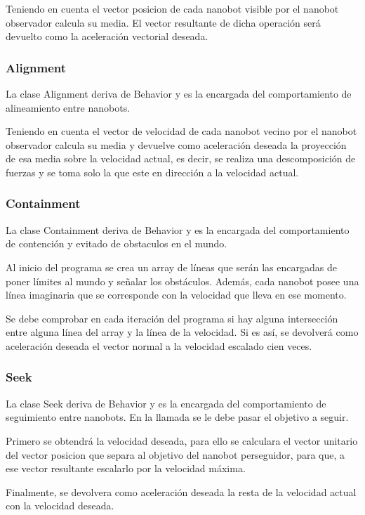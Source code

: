 Teniendo en cuenta el vector posicion de cada nanobot visible por el nanobot observador calcula su media. El vector resultante de dicha operación será devuelto como la aceleración vectorial deseada.

\subsubsection{Alignment}
\label{sec:alignment}
La clase Alignment deriva de Behavior y es la encargada del comportamiento de alineamiento entre nanobots.

Teniendo en cuenta el vector de velocidad de cada nanobot vecino por el nanobot observador calcula su media y devuelve como aceleración deseada la proyección de esa media sobre la velocidad actual, es decir, se realiza una descomposición de fuerzas y se toma solo la que este en dirección a la velocidad actual.

\subsubsection{Containment}
\label{sec:containment}
La clase Containment deriva de Behavior y es la encargada del comportamiento de contención y evitado de obstaculos en el mundo.

Al inicio del programa se crea un array de líneas que serán las encargadas de poner límites al mundo y señalar los obstáculos. Además, cada nanobot posee una línea imaginaria que se corresponde con la velocidad que lleva en ese momento.

Se debe comprobar en cada iteración del programa si hay alguna intersección entre alguna línea del array y la línea de la velocidad. Si es así, se devolverá como aceleración deseada el vector normal a la velocidad escalado cien veces.

\subsubsection{Seek}
\label{sec:seek}
La clase Seek deriva de Behavior y es la encargada del comportamiento de seguimiento entre nanobots. En la llamada se le debe pasar el objetivo a seguir. 

Primero se obtendrá la velocidad deseada, para ello se calculara el vector unitario del vector posicion que separa al objetivo del nanobot perseguidor, para que, a ese vector resultante escalarlo por la  velocidad máxima.

Finalmente, se devolvera como aceleración deseada la resta de la velocidad actual con la velocidad deseada.

